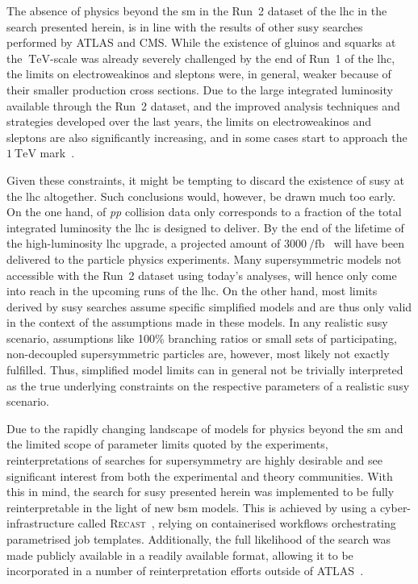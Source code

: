 The absence of physics beyond the \gls{sm} in the Run~2 dataset of the \gls{lhc} in the search presented herein, is in line with the results of other \gls{susy} searches performed by ATLAS and CMS.
While the existence of gluinos and squarks at the $\SI{}{\TeV}$-scale was already severely challenged by the end of Run~1 of the \gls{lhc}, the limits on electroweakinos and sleptons were, in general, weaker because of their smaller production cross sections.
Due to the large integrated luminosity available through the Run~2 dataset, and the improved analysis techniques and strategies developed over the last years, the limits on electroweakinos and sleptons are also significantly increasing, and in some cases start to approach the $\SI{1}{\TeV}$ mark~\cite{ATL-PHYS-PUB-2020-020,SUSY-2018-32}. 

Given these constraints, it might be tempting to discard the existence of \gls{susy} at the \gls{lhc} altogether. Such conclusions would, however, be drawn much too early.
On the one hand, \onethirtynineifb of \textit{pp} collision data only corresponds to a fraction of the total integrated luminosity the \gls{lhc} is designed to deliver. By the end of the lifetime of the high-luminosity \gls{lhc} upgrade, a projected amount of $\SI{3000}{\per\femto\barn}$~\cite{Apollinari:2116337} will have been delivered to the particle physics experiments.
Many supersymmetric models not accessible with the Run~2 dataset using today's analyses, will hence only come into reach in the upcoming runs of the \gls{lhc}.
On the other hand, most limits derived by \gls{susy} searches assume specific simplified models and are thus only valid in the context of the assumptions made in these models.
In any realistic \gls{susy} scenario, assumptions like 100\% branching ratios or small sets of participating, non-decoupled supersymmetric particles are, however, most likely not exactly fulfilled.
Thus, simplified model limits can in general not be trivially interpreted as the true underlying constraints on the respective parameters of a realistic \gls{susy} scenario.
 
Due to the rapidly changing landscape of models for physics beyond the \gls{sm} and the limited scope of parameter limits quoted by the experiments, reinterpretations of searches for supersymmetry are highly desirable and see significant interest from both the experimental and theory communities.
With this in mind, the search for \gls{susy} presented herein was implemented to be fully reinterpretable in the light of new \gls{bsm} models.
This is achieved by using a cyber-infrastructure called \textsc{Recast}~\cite{RECAST_cranmer}, relying on containerised workflows orchestrating parametrised job templates.
Additionally, the full likelihood of the search was made publicly available in a readily available format, allowing it to be incorporated in a number of reinterpretation efforts outside of ATLAS~\cite{SModelS_pyhf:2020grj,Goodsell:2020ddr}. 
 
